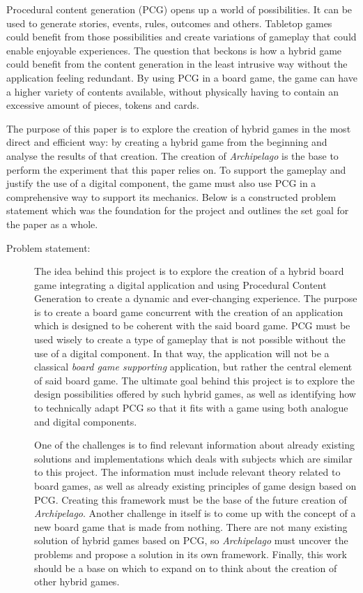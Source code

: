 Procedural content generation (PCG) opens up a world of possibilities. It can be used to generate stories, events, rules, outcomes and others. Tabletop games could benefit from those possibilities and create variations of gameplay that could enable enjoyable experiences. The question that beckons is how a hybrid game could benefit from the content generation in the least intrusive way without the application feeling redundant. By using PCG in a board game, the game can have a higher variety of contents available, without physically having to contain an excessive amount of pieces, tokens and cards. 

The purpose of this paper is to explore the creation of hybrid games in the most direct and efficient way: by creating a hybrid game from the beginning and analyse the results of that creation. The creation of \textit{Archipelago} is the base to perform the experiment that this paper relies on. To support the gameplay and justify the use of a digital component, the game must also use PCG in a comprehensive way to support its mechanics. Below is a constructed problem statement which was the foundation for the project and outlines the set goal for the paper as a whole.

\begin{description}
\item[Problem statement:]

The idea behind this project is to explore the creation of a hybrid board game integrating a digital application and using Procedural Content Generation to create a dynamic and ever-changing experience. The purpose is to create a board game concurrent with the creation of an application which is designed to be coherent with the said board game. PCG must be used wisely to create a type of gameplay that is not possible without the use of a digital component. In that way, the application will not be a classical \textit{board game supporting} application, but rather the central element of said board game. The ultimate goal behind this project is to explore the design possibilities offered by such hybrid games, as well as identifying how to technically adapt PCG so that it fits with a game using both analogue and digital components.

One of the challenges is to find relevant information about already existing solutions and implementations which deals with subjects which are similar to this project. The information must include relevant theory related to board games, as well as already existing principles of game design based on PCG. Creating this framework must be the base of the future creation of \textit{Archipelago}. Another challenge in itself is to come up with the concept of a new board game that is made from nothing. There are not many existing solution of hybrid games based on PCG, so \textit{Archipelago} must uncover the problems and propose a solution in its own framework. Finally, this work should be a base on which to expand on to think about the creation of other hybrid games. 
\end{description}

